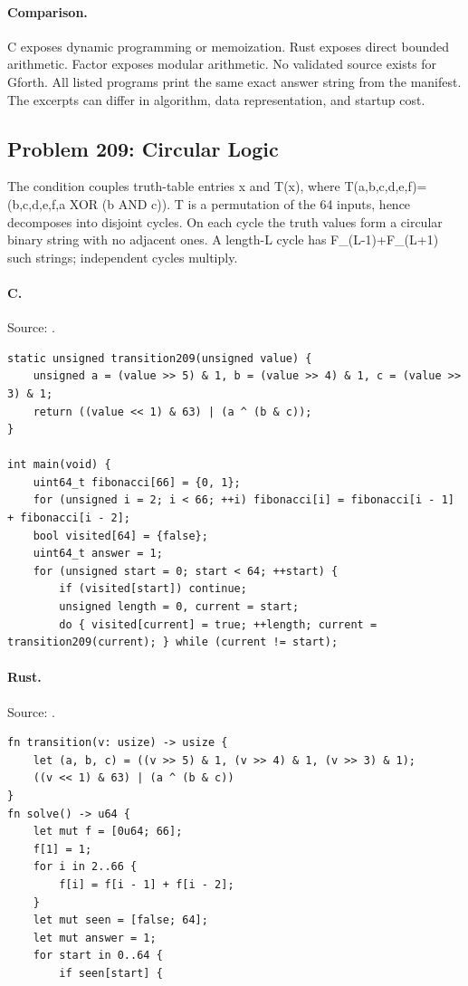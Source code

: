 \paragraph{Comparison.}
C exposes dynamic programming or memoization. Rust exposes direct bounded arithmetic. Factor exposes modular arithmetic.
No validated source exists for Gforth.
All listed programs print the same exact answer string from the manifest. The excerpts can differ in algorithm, data representation, and startup cost.

\subsection{Problem 209: Circular Logic}
\label{walkthrough:p209}
The condition couples truth-table entries x and T(x), where T(a,b,c,d,e,f)=(b,c,d,e,f,a XOR (b AND c)). T is a permutation of the 64 inputs, hence decomposes into disjoint cycles. On each cycle the truth values form a circular binary string with no adjacent ones. A length-L cycle has F\_(L-1)+F\_(L+1) such strings; independent cycles multiply.

\paragraph{C.} Source: .
\begin{lstlisting}
static unsigned transition209(unsigned value) {
    unsigned a = (value >> 5) & 1, b = (value >> 4) & 1, c = (value >> 3) & 1;
    return ((value << 1) & 63) | (a ^ (b & c));
}

int main(void) {
    uint64_t fibonacci[66] = {0, 1};
    for (unsigned i = 2; i < 66; ++i) fibonacci[i] = fibonacci[i - 1] + fibonacci[i - 2];
    bool visited[64] = {false};
    uint64_t answer = 1;
    for (unsigned start = 0; start < 64; ++start) {
        if (visited[start]) continue;
        unsigned length = 0, current = start;
        do { visited[current] = true; ++length; current = transition209(current); } while (current != start);
\end{lstlisting}

\paragraph{Rust.} Source: .
\begin{lstlisting}
fn transition(v: usize) -> usize {
    let (a, b, c) = ((v >> 5) & 1, (v >> 4) & 1, (v >> 3) & 1);
    ((v << 1) & 63) | (a ^ (b & c))
}
fn solve() -> u64 {
    let mut f = [0u64; 66];
    f[1] = 1;
    for i in 2..66 {
        f[i] = f[i - 1] + f[i - 2];
    }
    let mut seen = [false; 64];
    let mut answer = 1;
    for start in 0..64 {
        if seen[start] {
\end{lstlisting}


